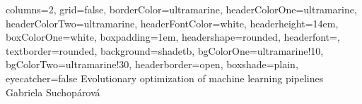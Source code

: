 \documentclass[a0paper,portrait]{baposter}
\begin{document}
\begin{poster}{
  columns=2,
	grid=false,
	borderColor=ultramarine,
	headerColorOne=ultramarine,
	headerColorTwo=ultramarine,
	headerFontColor=white,
  headerheight=14em,
	boxColorOne=white,
  boxpadding=1em,
	headershape=rounded,
	headerfont=\Large\textsf,
	textborder=rounded,
	background=shadetb,
  bgColorOne=ultramarine!10,
  bgColorTwo=ultramarine!30,
	headerborder=open,
  boxshade=plain,
  eyecatcher=false
}
{
}
{ \Huge Evolutionary optimization of machine learning pipelines}
{
  \\Gabriela Suchopárová
}





\end{poster}
\end{document}
